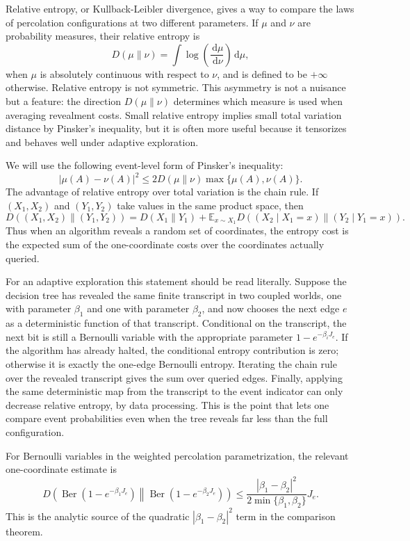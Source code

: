 \documentclass[11pt,reqno]{book}
\numberwithin{equation}{chapter}
\theoremstyle{plain}
\theoremstyle{definition}
\theoremstyle{remark}
\newcommand{\E}{\mathbb E}
\newcommand{\1}{\mathbf 1}
\newcommand{\dd}{\,\mathrm d}
\begin{document}
Relative entropy, or Kullback-Leibler divergence, gives a way to compare the laws of percolation configurations at two different parameters. If $\mu$ and $\nu$ are probability measures, their relative entropy is
\[
  D(\mu\|\nu)=\int \log\left(\frac{\dd\mu}{\dd\nu}\right)\dd\mu,
\]
when $\mu$ is absolutely continuous with respect to $\nu$, and is defined to be \(+\infty\) otherwise. Relative entropy is not symmetric. This asymmetry is not a nuisance but a feature: the direction \(D(\mu\|\nu)\) determines which measure is used when averaging revealment costs. Small relative entropy implies small total variation distance by Pinsker's inequality, but it is often more useful because it tensorizes and behaves well under adaptive exploration.

We will use the following event-level form of Pinsker's inequality:
\[
  |\mu(A)-\nu(A)|^2
  \leq
  2D(\mu\|\nu)\max\{\mu(A),\nu(A)\}.
\]
The advantage of relative entropy over total variation is the chain rule. If $(X_1,X_2)$ and $(Y_1,Y_2)$ take values in the same product space, then
\[
  D((X_1,X_2)\|(Y_1,Y_2))
  =
  D(X_1\|Y_1)
  +
  \E_{x\sim X_1}
  D((X_2\mid X_1=x)\|(Y_2\mid Y_1=x)).
\]
Thus when an algorithm reveals a random set of coordinates, the entropy cost is the expected sum of the one-coordinate costs over the coordinates actually queried.

For an adaptive exploration this statement should be read literally. Suppose the decision tree has revealed the same finite transcript in two coupled worlds, one with parameter \(\beta_1\) and one with parameter \(\beta_2\), and now chooses the next edge \(e\) as a deterministic function of that transcript. Conditional on the transcript, the next bit is still a Bernoulli variable with the appropriate parameter \(1-e^{-\beta_iJ_e}\). If the algorithm has already halted, the conditional entropy contribution is zero; otherwise it is exactly the one-edge Bernoulli entropy. Iterating the chain rule over the revealed transcript gives the sum over queried edges. Finally, applying the same deterministic map from the transcript to the event indicator can only decrease relative entropy, by data processing. This is the point that lets one compare event probabilities even when the tree reveals far less than the full configuration.

For Bernoulli variables in the weighted percolation parametrization, the relevant one-coordinate estimate is
\[
  D\!\left(
  \operatorname{Ber}(1-e^{-\beta_1J_e})
  \middle\|
  \operatorname{Ber}(1-e^{-\beta_2J_e})
  \right)
  \leq
  \frac{|\beta_1-\beta_2|^2}{2\min\{\beta_1,\beta_2\}}J_e.
\]
This is the analytic source of the quadratic $|\beta_1-\beta_2|^2$ term in the comparison theorem.
\end{document}
